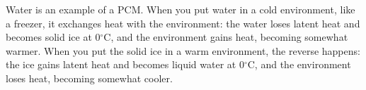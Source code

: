 Water is an example of a PCM.
When you put water in a cold environment, like a freezer, it exchanges heat with the environment: the water loses latent heat and becomes solid ice at 0$^{\circ}$C, and the environment gains heat, becoming somewhat warmer.
When you put the solid ice in a warm environment, the reverse happens: the ice gains latent heat and becomes liquid water at 0$^{\circ}$C, and the environment loses heat, becoming somewhat cooler.



